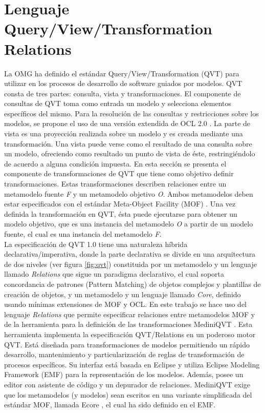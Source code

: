 \section{Lenguaje Query/View/Transformation Relations}
\label{Lenguaje Query/View/Transformation (QVT)}

La OMG ha definido el estándar Query/View/Transformation (QVT) \cite{QVT10} para utilizar en los procesos de desarrollo de software guiados por modelos. QVT consta de tres partes: consulta, vista y transformaciones. El componente de consultas de QVT toma como entrada un modelo y selecciona elementos específicos del mismo. Para la reso\-lución de las consultas y res\-tric\-ciones sobre los modelos, se propone el uso de una versión extendida de OCL 2.0 \cite{OCL20}. La parte de vista es una proyección realizada sobre un modelo y es creada mediante una transformación. Una vista puede verse como el resultado de una consulta sobre un modelo, ofreciendo como resultado un punto de vista de éste, restringiéndolo de acuerdo a alguna condición impuesta. 
En esta sección se presenta el componente de transformaciones de QVT que tiene como objetivo definir transformaciones. Estas transformaciones describen relaciones entre un metamodelo fuente \emph{F} y un metamodelo objetivo \emph{O}. Ambos metamodelos deben estar especificados con el estándar Meta-Object Facility (MOF) \cite{MOF11}. Una vez definida la transformación en QVT, ésta puede ejecutarse para obtener un modelo objetivo, que es una instancia del metamodelo \emph{O} a partir de un modelo fuente, el cual es una instancia del metamodelo \emph{F}.\\

La especificación de QVT 1.0 \cite{QVT10} tiene una naturaleza híbrida declarativa/im\-perativa, donde la parte declarativa se divide en una arquitectura de dos niveles
(ver figura \ref{fig:qvt}) constituida por un metamodelo y un lenguaje llamado \emph{Relations} que sigue un paradigma declarativo, el cual soporta 
concordancia de patrones (Pattern Matching) de objetos complejos y plantillas de creación de objetos, y un metamodelo y un lenguaje llamado \emph{Core}, 
definido usando mínimas extensiones de MOF y OCL.  En este trabajo se hace uso del lenguaje \emph{Relations} que permite especificar relaciones entre 
metamodelos MOF y de la herramienta para la definición de las transformaciones MediniQVT \cite{MED11}. 
Esta herra\-mienta implementa la especificación QVT/Relations en un poderoso motor QVT. Está diseñada para transformaciones de modelos permitiendo un 
rápido desarrollo, mantenimiento y particulari\-zación de reglas de transformación de procesos específicos. Su interfaz está basada en Eclipse y 
utiliza Eclipse Modeling Framework (EMF) \cite{EMF10} para la representación de los modelos. Además, posee un editor con asistente de código y un 
depurador de relaciones. MediniQVT exige que los metamodelos (y modelos) sean escritos en una variante simplificada del estándar MOF, llamada 
Ecore \cite{ECORE12}, el cual ha sido definido en el EMF.

